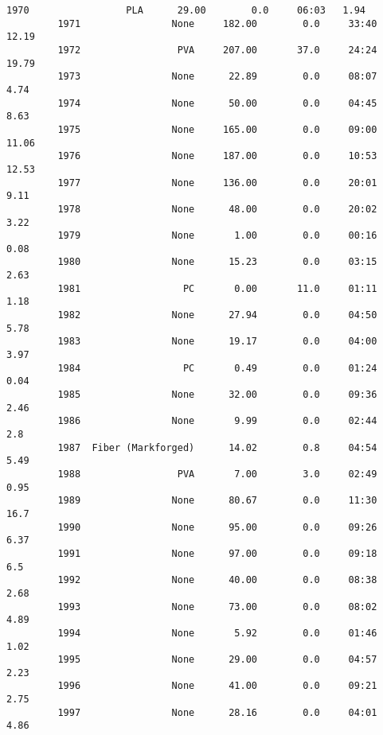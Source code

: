 \documentclass[11pt]{article}
\begin{document}
\begin{Verbatim}[commandchars=\\\{\}]
         1970                 PLA      29.00        0.0     06:03   1.94   
         1971                None     182.00        0.0     33:40  12.19   
         1972                 PVA     207.00       37.0     24:24  19.79   
         1973                None      22.89        0.0     08:07   4.74   
         1974                None      50.00        0.0     04:45   8.63   
         1975                None     165.00        0.0     09:00  11.06   
         1976                None     187.00        0.0     10:53  12.53   
         1977                None     136.00        0.0     20:01   9.11   
         1978                None      48.00        0.0     20:02   3.22   
         1979                None       1.00        0.0     00:16   0.08   
         1980                None      15.23        0.0     03:15   2.63   
         1981                  PC       0.00       11.0     01:11   1.18   
         1982                None      27.94        0.0     04:50   5.78   
         1983                None      19.17        0.0     04:00   3.97   
         1984                  PC       0.49        0.0     01:24   0.04   
         1985                None      32.00        0.0     09:36   2.46   
         1986                None       9.99        0.0     02:44    2.8   
         1987  Fiber (Markforged)      14.02        0.8     04:54   5.49   
         1988                 PVA       7.00        3.0     02:49   0.95   
         1989                None      80.67        0.0     11:30   16.7   
         1990                None      95.00        0.0     09:26   6.37   
         1991                None      97.00        0.0     09:18    6.5   
         1992                None      40.00        0.0     08:38   2.68   
         1993                None      73.00        0.0     08:02   4.89   
         1994                None       5.92        0.0     01:46   1.02   
         1995                None      29.00        0.0     04:57   2.23   
         1996                None      41.00        0.0     09:21   2.75   
         1997                None      28.16        0.0     04:01   4.86   
         

\end{Verbatim}
\end{document}
